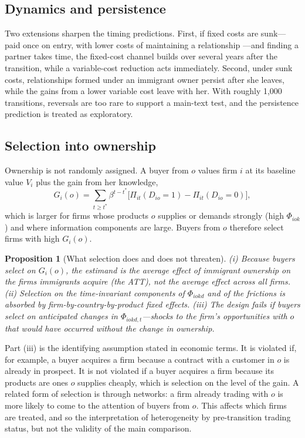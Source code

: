 \documentclass[12pt]{article}
\newtheorem{proposition}{Proposition}
\theoremstyle{remark}
\begin{document}
\subsection{Dynamics and persistence}

Two extensions sharpen the timing predictions. First, if fixed costs are
sunk---paid once on entry, with lower costs of maintaining a relationship
\citep{das2007}---and finding a partner takes time, the fixed-cost channel
builds over several years after the transition, while a variable-cost
reduction acts immediately. Second, under sunk costs, relationships formed
under an immigrant owner persist after she leaves, while the gains from a
lower variable cost leave with her. With roughly 1,000 transitions, reversals
are too rare to support a main-text test, and the persistence prediction is
treated as exploratory.

\subsection{Selection into ownership}
\label{sec:selection}

Ownership is not randomly assigned. A buyer from $o$ values firm $i$ at its
baseline value $V_i$ plus the gain from her knowledge,
\begin{equation}
G_i(o)=\sum_{t\geq t^*}\beta^{t-t^*}\big[\Pi_{it}(D_{io}=1)-\Pi_{it}(D_{io}=0)\big],
\end{equation}
which is larger for firms whose products $o$ supplies or demands strongly
(high $\Phi_{iok}$) and where information components are large. Buyers from
$o$ therefore select firms with high $G_i(o)$.

\begin{proposition}[What selection does and does not threaten]\label{prop:selection}
(i) Because buyers select on $G_i(o)$, the estimand is the average effect of
immigrant ownership on the firms immigrants acquire (the ATT), not the average
effect across all firms. (ii) Selection on the time-invariant components of
$\Phi_{iokd}$ and of the frictions is absorbed by firm-by-country-by-product
fixed effects. (iii) The design fails if buyers select on anticipated changes
in $\Phi_{iokd,t}$---shocks to the firm's opportunities with $o$ that would have
occurred without the change in ownership.
\end{proposition}

\noindent Part (iii) is the identifying assumption stated in economic terms.
It is violated if, for example, a buyer acquires a firm because a contract
with a customer in $o$ is already in prospect. It is not violated if a buyer
acquires a firm because its products are ones $o$ supplies cheaply, which is
selection on the level of the gain. A related form of selection is through
networks: a firm already trading with $o$ is more likely to come to the
attention of buyers from $o$. This affects which firms are treated, and so the
interpretation of heterogeneity by pre-transition trading status, but not
the validity of the main comparison.
\end{document}
